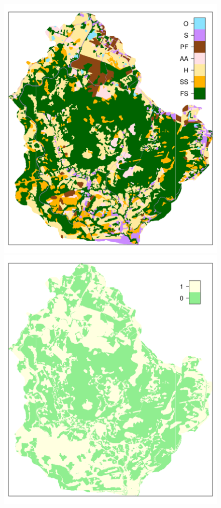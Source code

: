 \begin{figure}[!ht]
\begin{minipage}[b]{0.45\textwidth}
\includegraphics[width = \textwidth]{fig/chap05-land-new}
\end{minipage}
\begin{minipage}[b]{0.45\textwidth}
\subcaption{}
\centering
\includegraphics[width = \textwidth]{fig/chap05-land-diff}

\end{minipage}
\end{figure}
